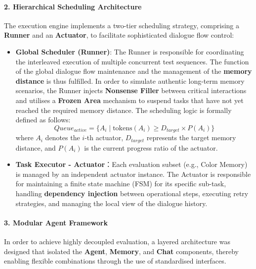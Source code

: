 \paragraph{2. Hierarchical Scheduling Architecture}

The execution engine implements a two-tier scheduling strategy, comprising a \textbf{Runner} and an \textbf{Actuator}, to facilitate sophisticated dialogue flow control:
\begin{itemize}
\item \textbf{Global Scheduler (Runner)}: The Runner is responsible for coordinating the interleaved execution of multiple concurrent test sequences. The function of the global dialogue flow maintenance and the management of the \textbf{memory distance} is thus fulfilled. In order to simulate authentic long-term memory scenarios, the Runner injects \textbf{Nonsense Filler} between critical interactions and utilises a \textbf{Frozen Area} mechanism to suspend tasks that have not yet reached the required memory distance. The scheduling logic is formally defined as follows:
$$
  Queue_{active} = \{ A_i \mid \text{tokens}(A_i) \geq D_{target} \times P(A_i) \}
  $$
  where $A_i$ denotes the $i$-th actuator, $D_{target}$ represents the target memory distance, and $P(A_i)$ is the current progress ratio of the actuator.

\item \textbf{Task Executor - Actuator}：Each evaluation subset (e.g., Color Memory) is managed by an independent actuator instance. The Actuator is responsible for maintaining a finite state machine (FSM) for its specific sub-task, handling \textbf{dependency injection} between operational steps, executing retry strategies, and managing the local view of the dialogue history.
\end{itemize}

\paragraph{3. Modular Agent Framework}

In order to achieve highly decoupled evaluation, a layered architecture was designed that isolated the \textbf{Agent}, \textbf{Memory}, and \textbf{Chat} components, thereby enabling flexible combinations through the use of standardised interfaces.


